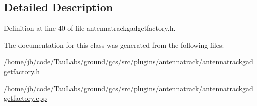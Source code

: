 \subsection{\-Detailed \-Description}


\-Definition at line 40 of file antennatrackgadgetfactory.\-h.



\-The documentation for this class was generated from the following files\-:\begin{DoxyCompactItemize}
\item 
/home/jb/code/\-Tau\-Labs/ground/gcs/src/plugins/antennatrack/\hyperlink{antennatrackgadgetfactory_8h}{antennatrackgadgetfactory.\-h}\item 
/home/jb/code/\-Tau\-Labs/ground/gcs/src/plugins/antennatrack/\hyperlink{antennatrackgadgetfactory_8cpp}{antennatrackgadgetfactory.\-cpp}\end{DoxyCompactItemize}
